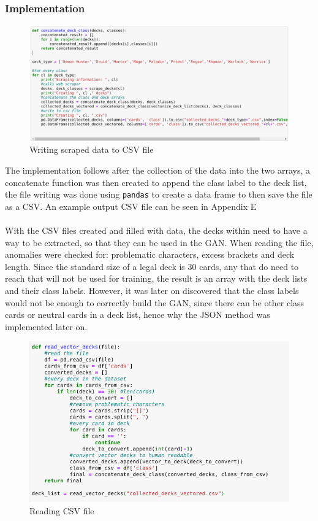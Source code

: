 \documentclass{report} %
\begin{document}
\subsubsection{Implementation}
\begin{figure}[H]
\centering
\includegraphics[width=1.25\textwidth]{csvIm}
\caption{Writing scraped data to CSV file\protect}
\label{board}
\end{figure}

The implementation follows after the collection of the data into the two arrays, a concatenate function was then created to append the class label to the deck list, the file writing was done using \nolinkurl{pandas} to create a data frame to then save the file as a CSV. An example output CSV file can be seen in Appendix E \\ \\

With the CSV files created and filled with data, the decks within need to have a way to be extracted, so that they can be used in the GAN. When reading the file, anomalies were checked for: problematic characters, excess brackets and deck length. Since the standard size of a legal deck is 30 cards, any that do need to reach that will not be used for training, the result is an array with the deck lists and their class labels. However, it was later on discovered that the class labels would not be enough to correctly build the GAN, since there can be other class cards or neutral cards in a deck list, hence why the JSON method was implemented later on.


\begin{figure}[H]
\centering
\includegraphics[width=1.25\textwidth]{readVectorDecks}
\caption{Reading CSV file\protect}
\label{board}
\end{figure}
\end{document}
